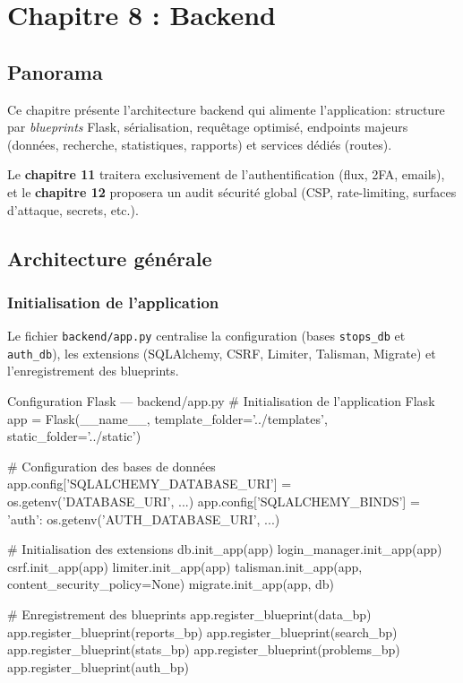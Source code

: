 \chapter{Chapitre 8 : Backend}

\section*{Panorama}

Ce chapitre présente l'architecture backend qui alimente l'application: structure par \textit{blueprints} Flask, sérialisation, requêtage optimisé, endpoints majeurs (données, recherche, statistiques, rapports) et services dédiés (routes). 

Le \textbf{chapitre 11} traitera exclusivement de l'authentification (flux, 2FA, emails), et le \textbf{chapitre 12} proposera un audit sécurité global (CSP, rate-limiting, surfaces d'attaque, secrets, etc.).

\section{Architecture générale}
\subsection*{Initialisation de l'application}

Le fichier \texttt{backend/app.py} centralise la configuration (bases \texttt{stops\_db} et \texttt{auth\_db}), les extensions (SQLAlchemy, CSRF, Limiter, Talisman, Migrate) et l'enregistrement des blueprints.

\begin{codebox}[language=Python]{Configuration Flask — backend/app.py}
# Initialisation de l'application Flask
app = Flask(__name__, 
           template_folder='../templates', 
           static_folder='../static')

# Configuration des bases de données
app.config['SQLALCHEMY_DATABASE_URI'] = os.getenv('DATABASE_URI', ...)
app.config['SQLALCHEMY_BINDS'] = {
    'auth': os.getenv('AUTH_DATABASE_URI', ...)
}

# Initialisation des extensions
db.init_app(app)
login_manager.init_app(app)
csrf.init_app(app)
limiter.init_app(app)
talisman.init_app(app, content_security_policy=None)
migrate.init_app(app, db)

# Enregistrement des blueprints
app.register_blueprint(data_bp)
app.register_blueprint(reports_bp)
app.register_blueprint(search_bp)
app.register_blueprint(stats_bp)
app.register_blueprint(problems_bp)
app.register_blueprint(auth_bp)
\end{codebox}

